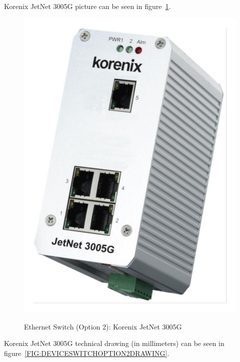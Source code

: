 Korenix JetNet 3005G picture can be seen in figure~\ref{FIG:DEVICESWITCHOPTION2}.
\begin{figure}
  \centering
  \includegraphics[angle=90,width=1\columnwidth]{figs/body02/FIGDEVICESWITCHOPTION2.pdf}\\
  \caption[Ethernet Switch (Option 2): Korenix JetNet 3008G]{Ethernet Switch (Option 2): Korenix JetNet 3005G}
  \label{FIG:DEVICESWITCHOPTION2}
\end{figure}
Korenix JetNet 3005G technical drawing (in millimeters) can be seen in figure~\ref{FIG:DEVICESWITCHOPTION2DRAWING}.
